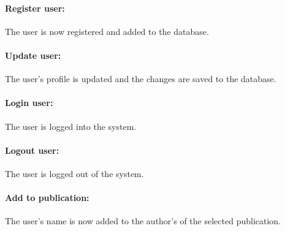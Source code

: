 \documentclass{article}
\begin{document}
				\paragraph{Register user:} The user is now registered and added to the database.
				\paragraph{Update user:} The user's profile is updated and the changes are saved to the database.
				\paragraph{Login user:} The user is logged into the system.
				\paragraph{Logout user:} The user is logged out of the system.
				\paragraph{Add to publication:} The user's name is now added to the author's of the selected publication.
\end{document}

